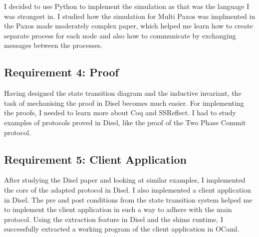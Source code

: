 I decided to use Python to implement the simulation as that was the language I
was strongest in. I studied how the simulation for Multi Paxos was implmented
in the Paxos made moderately complex paper, %
which helped me learn how to create separate process for each node and also how
to communicate by exchanging messages between the processes.

\subsection{Requirement 4: Proof}
Having designed the state transition diagram and the inductive invariant,
the task of mechanising the proof in Disel becomes much easier.
For implementing the proofs, I needed to learn more about Coq and SSReflect.
I had to study examples of protocols proved in Disel, like the proof of the
Two Phase Commit protocol.

\subsection{Requirement 5: Client Application} %
After studying the Disel paper and looking at similar examples, I implemented the
core of the adapted protocol in Disel. I also implemented a client application in
Disel. The pre and post conditions from the state transition system helped me to
implement the client application in such a way to adhere with the main protocol.
Using the extraction feature in Disel and the shims runtime, I successfully
extracted a working program of the client application in OCaml.
